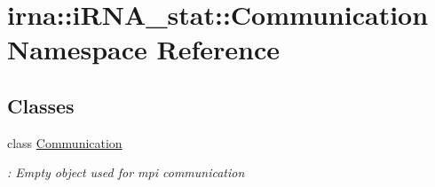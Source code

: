\hypertarget{namespaceirna_1_1iRNA__stat_1_1Communication}{
\section{irna\-:\-:i\-R\-N\-A\-\_\-stat\-:\-:\-Communication \-Namespace \-Reference}
\label{namespaceirna_1_1iRNA__stat_1_1Communication}
}
\subsection*{\-Classes}
\begin{DoxyCompactItemize}
\item 
class \hyperlink{classirna_1_1iRNA__stat_1_1Communication_1_1Communication}{\-Communication}
\begin{DoxyCompactList}\small\item\em \-: \-Empty object used for mpi communication \end{DoxyCompactList}\end{DoxyCompactItemize}
